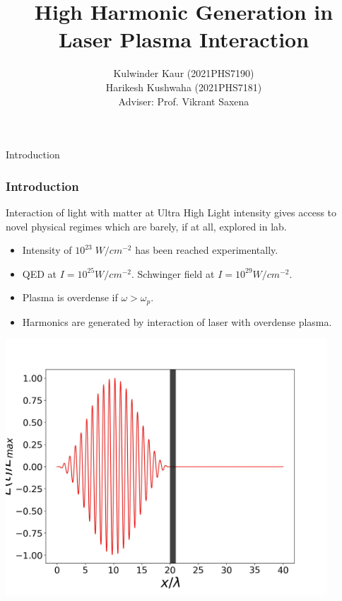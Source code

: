 \documentclass{beamer}
\title[High Harmonic Generation]{High Harmonic Generation in Laser Plasma Interaction}
\date{}
\institute[IIT Delhi]{\large Indian Institute of Technology, Delhi}
\author[]{Kulwinder Kaur (2021PHS7190)\\ Harikesh Kushwaha (2021PHS7181)\\[3mm]Adviser: Prof. Vikrant Saxena}
\begin{document}
\maketitle
\begin{frame}{Introduction}
    \frametitle{Introduction}
    \small
    Interaction of light with matter at Ultra High Light intensity gives access to novel physical regimes which are barely, if at all, explored in lab.
    \begin{itemize}
        \item Intensity of $10^{23} \; W/cm^{-2}$ has been reached experimentally.\footnotemark
        \item QED at $I = 10^{25}W/cm^{-2}$. Schwinger field at $I = 10^{29}W/cm^{-2}$.\footnotemark
        \item Plasma is overdense if $\omega>\omega_p$.
        \item Harmonics are generated by interaction of laser with overdense plasma.\footnotemark
    \end{itemize}
    \begin{minipage}[h]{0.48\linewidth}
        \centering
        \includegraphics[width=0.9\textwidth, height=0.42\textheight]{images/field.jpg}

\end{minipage}
\end{frame}
\end{document}
